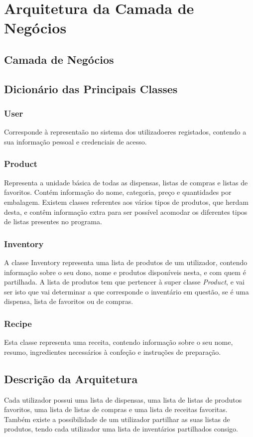 \documentclass[a4paper]{report}
\begin{document}
\chapter{Arquitetura da Camada de Negócios}
    \section{Camada de Negócios}
    \section{Dicionário das Principais Classes}
        \subsection{User}
        Corresponde à representaão no sistema dos utilizadoeres registados,
        contendo a sua informação pessoal e credenciais de acesso.
        \subsection{Product}
        Representa a unidade básica de todas as dispensas, listas de compras e
        listas de favoritos. Contém informação do nome, categoria, preço e
        quantidades por embalagem. Existem classes referentes aos vários tipos
        de produtos, que herdam desta, e contêm informação extra para ser
        possível acomodar os diferentes tipos de listas presentes no programa.
        \subsection{Inventory}
        A classe Inventory representa uma lista de produtos de um utilizador, contendo
        informação sobre o seu dono, nome e produtos disponíveis nesta, e 
        com quem é partilhada. A lista de produtos tem que pertencer à super
        classe \textit{Product}, e vai ser isto que vai determinar a que
        corresponde o inventário em questão, se é uma dispensa, lista de
        favoritos ou de compras.
        \subsection{Recipe}
        Esta classe representa uma receita, contendo informação sobre o seu
        nome, resumo, ingredientes necessários à confeção e instruções de
        preparação.
    \section{Descrição da Arquitetura}
    Cada utilizador possui uma lista de dispensas, uma lista de listas de 
    produtos favoritos, uma lista de listas de compras e uma lista de receitas
    favoritas.
    Também existe a possibilidade de um utilizador partilhar as suas listas de
    produtos, tendo cada utilizador uma lista de inventários partilhados
    consigo.
\end{document}
